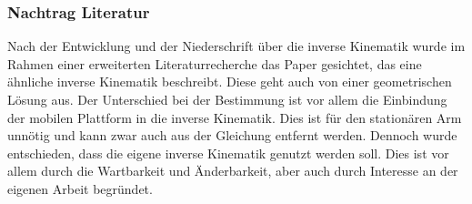\subsubsection{Nachtrag Literatur}
Nach der Entwicklung und der Niederschrift über die inverse Kinematik wurde im Rahmen einer erweiterten Literaturrecherche das Paper \cite{6309496} gesichtet, das eine ähnliche inverse Kinematik beschreibt. Diese geht auch von einer geometrischen Lösung aus. Der Unterschied bei der Bestimmung ist vor allem die Einbindung der mobilen Plattform in die inverse Kinematik. Dies ist für den stationären Arm unnötig und kann zwar auch aus der Gleichung entfernt werden. Dennoch wurde entschieden, dass die eigene inverse Kinematik genutzt werden soll. Dies ist vor allem durch die Wartbarkeit und Änderbarkeit, aber auch durch Interesse an der eigenen Arbeit begründet.
